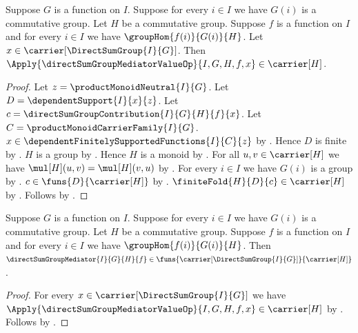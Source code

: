 \begin{proposition}\label{direct_sum_group_mediator_value_type}
    Suppose $G$ is a function on $I$.
    Suppose for every $i\in I$ we have $G(i)$ is a commutative group.
    Let $H$ be a commutative group.
    Suppose $f$ is a function on $I$ and
        for every $i\in I$ we have $\groupHom{f(i)}{G(i)}{H}$.
    Let $x\in\carrier[\DirectSumGroup{I}{G}]$.
    Then
        $\Apply{\directSumGroupMediatorValueOp}{I,G,H,f,x}
            \in\carrier[H]$.
\end{proposition}
\begin{proof}
    Let $z=\productMonoidNeutral{I}{G}$.
    Let $D=\dependentSupport{I}{x}{z}$.
    Let $c=\directSumGroupContribution{I}{G}{H}{f}{x}$.
    Let $C=\productMonoidCarrierFamily{I}{G}$.
    $x\in\dependentFinitelySupportedFunctions{I}{C}{z}$ by
        .
    Hence $D$ is finite by
        .
    $H$ is a group by .
    Hence $H$ is a monoid by .
    For all $u,v\in\carrier[H]$ we have
        $\mul[H](u,v)=\mul[H](v,u)$ by
        .
    For every $i\in I$ we have $G(i)$ is a group by
        .
    $c\in\funs{D}{\carrier[H]}$ by
        .
    $\finiteFold{H}{D}{c}\in\carrier[H]$ by
        .
    Follows by .
\end{proof}

\begin{proposition}\label{direct_sum_group_mediator_type}
    Suppose $G$ is a function on $I$.
    Suppose for every $i\in I$ we have $G(i)$ is a commutative group.
    Let $H$ be a commutative group.
    Suppose $f$ is a function on $I$ and
        for every $i\in I$ we have $\groupHom{f(i)}{G(i)}{H}$.
    Then
        $\directSumGroupMediator{I}{G}{H}{f}\in
            \funs{\carrier[\DirectSumGroup{I}{G}]}{\carrier[H]}$.
\end{proposition}
\begin{proof}
    For every $x\in\carrier[\DirectSumGroup{I}{G}]$ we have
        $\Apply{\directSumGroupMediatorValueOp}{I,G,H,f,x}
            \in\carrier[H]$ by
        .
    Follows by
        .
\end{proof}

